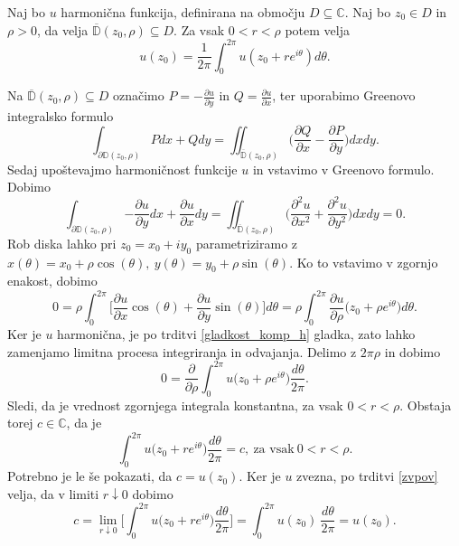 \documentclass[mat1, tisk]{fmfdelo}
\begin{document}
    \begin{trditev}
        \label{harmonicnapovp}
        Naj bo $u$ harmonična funkcija, definirana na območju $D \subseteq \mathbb{C}$. Naj bo $z_0 \in D$ in $\rho > 0$, da velja $\overline{\mathbb{D}}(z_0, \rho) \subseteq D$. Za vsak $0 < r < \rho$ potem velja
            $$
                u(z_0) = \frac{1}{2 \pi} \int_{0}^{2 \pi}{u(z_0 + r e^{i \theta}) d\theta}.
            $$
    \end{trditev}
    \begin{dokaz}
        Na $\overline{\mathbb{D}}(z_0, \rho) \subseteq D$ označimo $P = -\frac{\partial u}{\partial y}$ in $Q = \frac{\partial u}{\partial x}$, ter uporabimo Greenovo integralsko formulo
        $$
            \int_{\partial \mathbb{D}(z_0, \rho)}{P dx + Q dy} = \iint_{\overline{\mathbb{D}}(z_0, \rho)}{\bigg(\frac{\partial Q}{\partial x} - \frac{\partial P}{\partial y}\bigg)dx dy}.
        $$ 
        Sedaj upoštevajmo harmoničnost funkcije $u$ in vstavimo v Greenovo formulo. Dobimo
        $$
        \int_{\partial \mathbb{D}(z_0, \rho)}{-\frac{\partial u}{\partial y} dx + \frac{\partial u}{\partial x} dy} = \iint_{\overline{\mathbb{D}}(z_0, \rho)}{\bigg(\frac{\partial^2 u}{\partial x^2} + \frac{\partial^2 u}{\partial y^2}\bigg)dx dy} = 0. 
        $$
        Rob diska lahko pri $z_0 = x_0 + iy_0$ parametriziramo z $x(\theta) = x_0 + \rho \cos(\theta),~y(\theta) = y_0 + \rho \sin(\theta)$. Ko to vstavimo v zgornjo enakost, dobimo
        $$
        0 = \rho \int_{0}^{2 \pi}{\bigg[\frac{\partial u}{\partial x} \cos(\theta) + \frac{\partial u}{\partial y} \sin(\theta)\bigg] d\theta} = \rho \int_{0}^{2\pi}{\frac{\partial u}{\partial \rho}\big({z_0 + \rho e^{i\theta}\big)d\theta}}.
        $$
        Ker je $u$ harmonična, je po trditvi \ref{gladkost_komp_h} gladka, zato lahko zamenjamo limitna procesa integriranja in odvajanja. Delimo z $2\pi \rho$ in dobimo
        $$
        0 = \frac{\partial}{\partial \rho} \int_{0}^{2\pi}{u\big({z_0 + \rho e^{i\theta}\big)\frac{d\theta}{2 \pi}}}.
        $$
        Sledi, da je vrednost zgornjega integrala konstantna, za vsak $0 <r < \rho$. Obstaja torej $c \in \mathbb{C}$, da je
        $$
        \int_{0}^{2\pi}{u\big({z_0 + r e^{i\theta}\big)\frac{d\theta}{2 \pi}}} = c,~\text{za vsak}~ 0 < r < \rho.
        $$
        Potrebno je le še pokazati, da $c = u(z_0)$.
        Ker je $u$ zvezna, po trditvi \ref{zvpov} velja, da v limiti $r \downarrow 0$ dobimo
        $$
        c = \lim_{r \downarrow 0}{\bigg[\int_{0}^{2\pi}{u\big({z_0 + r e^{i\theta}\big)\frac{d\theta}{2 \pi}}}\bigg]} = \int_{0}^{2\pi}{{u(z_0)~\frac{d\theta}{2 \pi}}} = u(z_0).
        $$
    \end{dokaz}
\end{document}
